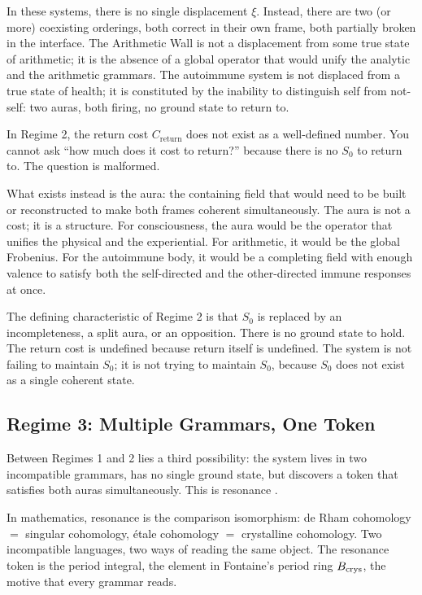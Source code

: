 \documentclass[12pt]{article}
\theoremstyle{definition}
\theoremstyle{remark}
\begin{document}
In these systems, there is no single displacement $\xi$. Instead, there are two (or more) coexisting orderings, both correct in their own frame, both partially broken in the interface. The Arithmetic Wall is not a displacement from some true state of arithmetic; it is the absence of a global operator that would unify the analytic and the arithmetic grammars. The autoimmune system is not displaced from a true state of health; it is constituted by the inability to distinguish self from not-self: two auras, both firing, no ground state to return to.

In Regime 2, the return cost $C_{\text{return}}$ does not exist as a well-defined number. You cannot ask ``how much does it cost to return?'' because there is no $S_0$ to return to. The question is malformed.

What exists instead is the aura: the containing field that would need to be built or reconstructed to make both frames coherent simultaneously. The aura is not a cost; it is a structure. For consciousness, the aura would be the operator that unifies the physical and the experiential. For arithmetic, it would be the global Frobenius. For the autoimmune body, it would be a completing field with enough valence to satisfy both the self-directed and the other-directed immune responses at once.

The defining characteristic of Regime 2 is that $S_0$ is replaced by an incompleteness, a split aura, or an opposition. There is no ground state to hold. The return cost is undefined because return itself is undefined. The system is not failing to maintain $S_0$; it is not trying to maintain $S_0$, because $S_0$ does not exist as a single coherent state.

\subsection{Regime 3: Multiple Grammars, One Token}

Between Regimes 1 and 2 lies a third possibility: the system lives in two incompatible grammars, has no single ground state, but discovers a token that satisfies both auras simultaneously. This is resonance \cite{resonance}.

In mathematics, resonance is the comparison isomorphism: de Rham cohomology $=$ singular cohomology, \'etale cohomology $=$ crystalline cohomology. Two incompatible languages, two ways of reading the same object. The resonance token is the period integral, the element in Fontaine's period ring $B_{\rm crys}$, the motive that every grammar reads.
\end{document}
